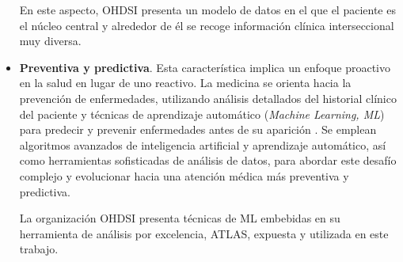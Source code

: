 \begin{itemize}
En este aspecto, OHDSI presenta un modelo de datos en el que el paciente es el núcleo central y alrededor de él se recoge información clínica interseccional muy diversa.




\item \textbf{Preventiva y predictiva}. Esta característica implica un enfoque proactivo en la salud en lugar de uno reactivo. La medicina se orienta hacia la prevención de enfermedades, utilizando análisis detallados del historial clínico del paciente y técnicas de aprendizaje automático (\textit{Machine Learning, ML}) para predecir y prevenir enfermedades antes de su aparición \cite{ruiz2023inteligencia}. Se emplean algoritmos avanzados de inteligencia artificial y aprendizaje automático, así como herramientas sofisticadas de análisis de datos, para abordar este desafío complejo y evolucionar hacia una atención médica más preventiva y predictiva.

La organización OHDSI presenta técnicas de ML embebidas en su herramienta de análisis por excelencia, ATLAS, expuesta y utilizada en este trabajo.


\end{itemize}
